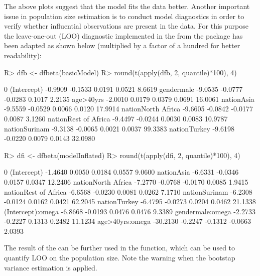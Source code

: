 \documentclass[nojss]{jss}
\newcommand{\1}{\mathcal{I}} \newcommand{\bZero}{\boldsymbol{0}}
\begin{document}
The above plots suggest that the  model fits the data
better. Another important issue in population size estimation is to
conduct model diagnostics in order to verify whether influential
observations are present in the data. For this purpose the leave-one-out
(LOO) diagnostic implemented in the  from the 
package has been adapted as shown below (multiplied by a factor of a
hundred for better readability):

\begin{CodeChunk}
\begin{CodeInput}
R> dfb <- dfbeta(basicModel)
R> round(t(apply(dfb, 2, quantile)*100), 4)
\end{CodeInput}
\begin{CodeOutput}
                          0%
(Intercept)          -0.9909 -0.1533  0.0191 0.0521  8.6619
gendermale           -9.0535 -0.0777 -0.0283 0.1017  2.2135
age>40yrs            -2.0010  0.0179  0.0379 0.0691 16.0061
nationAsia           -9.5559 -0.0529  0.0066 0.0120 17.9914
nationNorth Africa   -9.6605 -0.0842 -0.0177 0.0087  3.1260
nationRest of Africa -9.4497 -0.0244  0.0030 0.0083 10.9787
nationSurinam        -9.3138 -0.0065  0.0021 0.0037 99.3383
nationTurkey         -9.6198 -0.0220  0.0079 0.0143 32.0980
\end{CodeOutput}
\end{CodeChunk}

\begin{CodeChunk}
\begin{CodeInput}
R> dfi <- dfbeta(modelInflated)
R> round(t(apply(dfi, 2, quantile)*100), 4)
\end{CodeInput}
\begin{CodeOutput}
                           0%
(Intercept)           -1.4640  0.0050  0.0184  0.0557  9.0600
nationAsia            -6.6331 -0.0346  0.0157  0.0347 12.2406
nationNorth Africa    -7.2770 -0.0768 -0.0170  0.0085  1.9415
nationRest of Africa  -6.6568 -0.0230  0.0081  0.0262  7.1710
nationSurinam         -6.2308 -0.0124  0.0162  0.0421 62.2045
nationTurkey          -6.4795 -0.0273  0.0204  0.0462 21.1338
(Intercept):omega     -6.8668 -0.0193  0.0476  0.0476  9.3389
gendermale:omega      -2.2733 -0.2227  0.1313  0.2482 11.1234
age>40yrs:omega      -30.2130 -0.2247 -0.1312 -0.0663  2.0393
\end{CodeOutput}
\end{CodeChunk}

The result of the  can be further used in the
 function, which can be used to quantify LOO on the
population size. Note the warning when the bootstap variance estimation
is applied.
\end{document}

